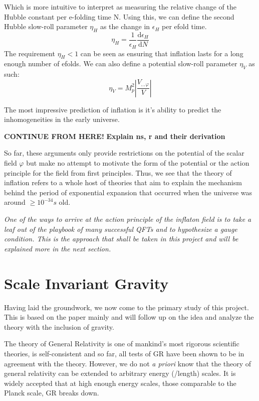 \documentclass[aps,prd,reprint,preprintnumbers,showpacs,floatfix,nofootinbib,superscript address]{revtex4-2}
\begin{document}
Which is more intuitive to interpret as measuring the relative change of the Hubble constant per e-folding time N. Using this, we can define the second Hubble slow-roll parameter $\eta_H$ as the change in $\epsilon_H$ per efold time.
\begin{equation}
    \eta_H = \frac{1}{\epsilon_H} \frac{\text{d}\epsilon_H}{\text{d}N}
\end{equation}
The requirement $\eta_H < 1$ can be seen as ensuring that inflation lasts for a long enough number of efolds. We can also define a potential slow-roll parameter $\eta_V$ as such:
\begin{equation}
    \eta_V = M_p^2 \left| \frac{V_{,,\varphi}}{V} \right|
\end{equation}

The most impressive prediction of inflation is it's ability to predict the inhomogeneities in the early universe. 


\textbf{CONTINUE FROM HERE!}
\textbf{Explain ns, r and their derivation}


So far, these arguments only provide restrictions on the potential of the scalar field $\varphi$ but make no attempt to motivate the form of the potential or the action principle for the field from first principles. Thus, we see that the theory of inflation refers to a whole host of theories that aim to explain the mechanism behind the period of exponential expansion that occurred when the universe was around $\geq 10^{-34}s$ old.

\textit{One of the ways to arrive at the action principle of the inflaton field is to take a leaf out of the playbook of many successful QFTs and to hypothesize a gauge condition. This is the approach that shall be taken in this project and will be explained more in the next section.}

\section{Scale Invariant Gravity} \label{Scale Invariant Gravity}
Having laid the groundwork, we now come to the primary study of this project. This is based on the paper \cite{barker2024poincaregaugetheoryconformal} mainly and will follow up on the idea and analyze the theory with the inclusion of gravity.

The theory of General Relativity is one of mankind's most rigorous scientific theories, is self-consistent and so far, all tests of GR have been shown to be in agreement with the theory. However, we do not \textit{a priori} know that the theory of general relativity can be extended to arbitrary energy (/length) scales. It is widely accepted that at high enough energy scales, those comparable to the Planck scale, GR breaks down. 
\end{document}
